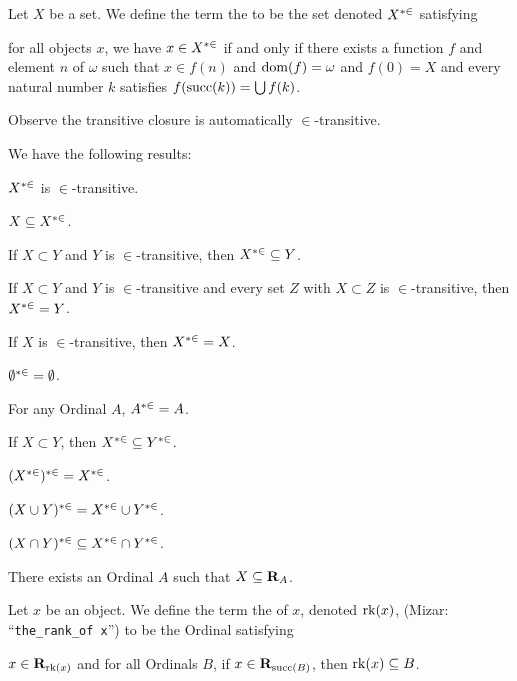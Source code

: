 \documentclass{article}
\begin{document}
\begin{definition}
Let $X$ be a set.
We define the term the  to be the set
denoted $X^{*\in}$ satisfying
\begin{defn}
\item for all objects $x$, we have $x\in X^{*\in}$ if and only if
  there exists a function $f$ and element $n$ of $\omega$ such that
  $x\in f(n)$ and $\operatorname{dom}(f)=\omega$ and $f(0)=X$ and every natural
  number $k$ satisfies $f(\operatorname{succ}(k))=\bigcup f(k)$.
\end{defn}
\end{definition}
Observe the transitive closure is automatically $\in$-transitive.

We have the following results:
\begin{thm}
\item\label{classes1:51} $X^{*\in}$ is $\in$-transitive.
\item\label{classes1:52} $X\subseteq X^{*\in}$.
\item\label{classes1:53} If $X\subset Y$ and $Y$ is $\in$-transitive,
  then $X^{*\in}\subseteq Y$.
\item\label{classes1:54} If $X\subset Y$ and $Y$ is $\in$-transitive and
  every set $Z$ with $X\subset Z$ is $\in$-transitive,
  then $X^{*\in}=Y$.
\item\label{classes1:55} If $X$ is $\in$-transitive, then $X^{*\in}=X$.
\item\label{classes1:56} $\emptyset^{*\in}=\emptyset$.
\item\label{classes1:57} For any Ordinal $A$, $A^{*\in}=A$.
\item\label{classes1:58} If $X\subset Y$, then $X^{*\in}\subseteq Y^{*\in}$.
\item\label{classes1:59} $(X^{*\in})^{*\in}=X^{*\in}$.
\item\label{classes1:60} $(X\cup Y)^{*\in}=X^{*\in}\cup Y^{*\in}$.
\item\label{classes1:61} $(X\cap Y)^{*\in}\subseteq X^{*\in}\cap Y^{*\in}$.
\item\label{classes1:62} There exists an Ordinal $A$ such that $X\subseteq\mathbf{R}_{A}$.
\end{thm}

\begin{definition}
Let $x$ be an object.
We define the term the  of $x$, denoted $\operatorname{rk}(x)$, (Mizar:
``\verb#the_rank_of x#'') to be the Ordinal satisfying
\begin{defn}
\item $x\in\mathbf{R}_{\operatorname{rk}(x)}$ and for all Ordinals $B$, if
  $x\in\mathbf{R}_{\operatorname{succ}(B)}$, then $\operatorname{rk}(x)\subseteq B$.
\end{defn}
\end{definition}
\end{document}
